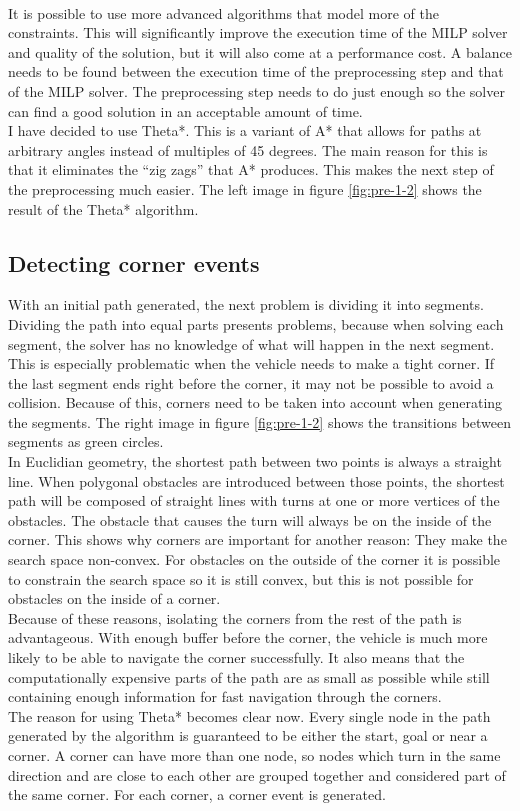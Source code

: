 \\
It is possible to use more advanced algorithms that model more of the constraints. This will significantly improve the execution time of the MILP solver and quality of the solution, but it will also come at a performance cost. A balance needs to be found between the execution time of the preprocessing step and that of the MILP solver. The preprocessing step needs to do just enough so the solver can find a good solution in an acceptable amount of time. 
\\
I have decided to use Theta*. This is a variant  of A* that allows for paths at arbitrary angles instead of multiples of 45 degrees. The main reason for this is that it eliminates the ``zig zags'' that A* produces. This makes the next step of the preprocessing much easier. The left image in figure \ref{fig:pre-1-2} shows the result of the Theta* algorithm.\\
\subsection{Detecting corner events}
With an initial path generated, the next problem is dividing it into segments. Dividing the path into equal parts presents problems, because when solving each segment, the solver has no knowledge of what will happen in the next segment. This is especially problematic when the vehicle needs to make a tight corner. If the last segment ends right before the corner, it may not be possible to avoid a collision. Because of this, corners need to be taken into account when generating the segments. The right image in figure \ref{fig:pre-1-2} shows the transitions between segments as green circles.\\
In Euclidian geometry, the shortest path between two points is always a straight line. When polygonal obstacles are introduced between those points, the shortest path will be composed of straight lines with turns at one or more vertices of the obstacles. The obstacle that causes the turn will always be on the inside of the corner. This shows why corners are important for another reason: They make the search space non-convex. For obstacles on the outside of the corner it is possible to constrain the search space so it is still convex, but this is not possible for obstacles on the inside of a corner.\\
Because of these reasons, isolating the corners from the rest of the path is advantageous. With enough buffer before the corner, the vehicle is much more likely to be able to navigate the corner successfully. It also means that the computationally expensive parts of the path are as small as possible while still containing enough information for fast navigation through the corners.
\\
The reason for using Theta* becomes clear now. Every single node in the path generated by the algorithm is guaranteed to be either the start, goal or near a corner. A corner can have more than one node, so nodes which turn in the same direction and are close to each other are grouped together and considered part of the same corner. For each corner, a corner event is generated.

